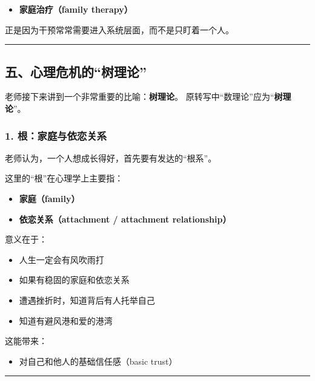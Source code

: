 \documentclass[
  chinese,
  9pt,
  a4paper,
]{ctexart}
\providecommand{\tightlist}{%
  \setlength{\itemsep}{0pt}\setlength{\parskip}{0pt}}
\begin{document}
\begin{itemize}
\tightlist
\item
  \textbf{家庭治疗（family therapy）}
\end{itemize}

正是因为干预常常需要进入系统层面，而不是只盯着一个人。

\begin{center}\rule{0.5\linewidth}{0.5pt}\end{center}

\subsection{五、心理危机的``树理论''}\label{ux4e94ux5fc3ux7406ux5371ux673aux7684ux6811ux7406ux8bba}

老师接下来讲到一个非常重要的比喻：\textbf{树理论}。
原转写中``数理论''应为``\textbf{树理论}''。

\subsubsection{1.
根：家庭与依恋关系}\label{ux6839ux5bb6ux5eadux4e0eux4f9dux604bux5173ux7cfb}

老师认为，一个人想成长得好，首先要有发达的``根系''。

这里的``根''在心理学上主要指：

\begin{itemize}
\tightlist
\item
  \textbf{家庭（family）}
\item
  \textbf{依恋关系（attachment / attachment relationship）}
\end{itemize}

意义在于：

\begin{itemize}
\tightlist
\item
  人生一定会有风吹雨打
\item
  如果有稳固的家庭和依恋关系
\item
  遭遇挫折时，知道背后有人托举自己
\item
  知道有避风港和爱的港湾
\end{itemize}

这能带来：

\begin{itemize}
\tightlist
\item
  对自己和他人的基础信任感（basic trust）
\end{itemize}

\begin{center}\rule{0.5\linewidth}{0.5pt}\end{center}
\end{document}
